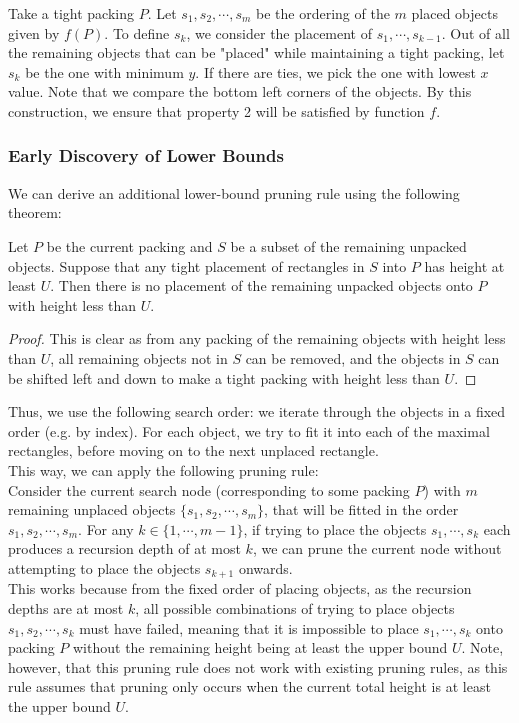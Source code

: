\documentclass{article}
\begin{document}
Take a tight packing $P$. Let $s_1,s_2,\cdots,s_m$ be the ordering of the $m$ placed objects given by $f(P)$. To define $s_k$, we consider the placement of $s_1,\cdots,s_{k-1}$. Out of all the remaining objects that can be "placed" while maintaining a tight packing, let $s_k$ be the one with minimum $y$. If there are ties, we pick the one with lowest $x$ value. Note that we compare the bottom left corners of the objects. By this construction, we ensure that property 2 will be satisfied by function $f$.

\subsubsection{Early Discovery of Lower Bounds}
We can derive an additional lower-bound pruning rule using the following theorem:

\begin{thm}
\label{thm:kprune}
Let $P$ be the current packing and $S$ be a subset of the remaining unpacked objects. Suppose that any tight placement of rectangles in $S$ into $P$ has height at least $U$. Then there is no placement of the remaining unpacked objects onto $P$ with height less than $U$.
\end{thm}
\begin{proof}
This is clear as from any packing of the remaining objects with height less than $U$, all remaining objects not in $S$ can be removed, and the objects in $S$ can be shifted left and down to make a tight packing with height less than $U$.
\end{proof}

Thus, we use the following search order: we iterate through the objects in a fixed order (e.g. by index). For each object, we try to fit it into each of the maximal rectangles, before moving on to the next unplaced rectangle.\\

This way, we can apply the following pruning rule:\\
Consider the current search node (corresponding to some packing $P$) with $m$ remaining unplaced objects $\{s_1,s_2,\cdots,s_m\}$, that will be fitted in the order $s_1,s_2,\cdots,s_m$. For any $k \in \{1,\cdots,m-1\}$, if trying to place the objects $s_1,\cdots,s_k$ each produces a recursion depth of at most $k$, we can prune the current node without attempting to place the objects $s_{k+1}$ onwards.\\

This works because from the fixed order of placing objects, as the recursion depths are at most $k$, all possible combinations of trying to place objects $s_1,s_2,\cdots,s_k$ must have failed, meaning that it is impossible to place $s_1,\cdots,s_k$ onto packing $P$ without the remaining height being at least the upper bound $U$. Note, however, that this pruning rule does not work with existing pruning rules, as this rule assumes that pruning only occurs when the current total height is at least the upper bound $U$.\\
\end{document}
